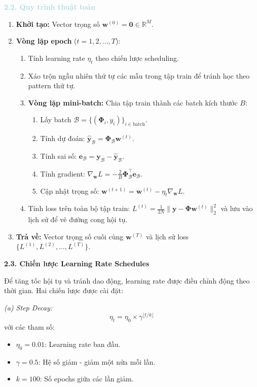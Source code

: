 \noindent\textcolor{lightblue}{\textbf{2.2. Quy trình thuật toán}}
\begin{enumerate}
    \item \textbf{Khởi tạo:} Vector trọng số $\mathbf{w}^{(0)} = \mathbf{0} \in \mathbb{R}^{M}$.
    
    \item \textbf{Vòng lặp epoch} ($t = 1, 2, \ldots, T$):
    \begin{enumerate}
        \item Tính learning rate $\eta_t$ theo chiến lược scheduling.
        \item Xáo trộn ngẫu nhiên thứ tự các mẫu trong tập train để tránh học theo pattern thứ tự.
        \item \textbf{Vòng lặp mini-batch:} Chia tập train thành các batch kích thước $B$:
        \begin{enumerate}
            \item Lấy batch $\mathcal{B} = \{(\mathbf{\Phi}_i, y_i)\}_{i \in \text{batch}}$.
            \item Tính dự đoán: $\hat{\mathbf{y}}_{\mathcal{B}} = \mathbf{\Phi}_{\mathcal{B}} \mathbf{w}^{(t)}$.
            \item Tính sai số: $\mathbf{e}_{\mathcal{B}} = \mathbf{y}_{\mathcal{B}} - \hat{\mathbf{y}}_{\mathcal{B}}$.
            \item Tính gradient: $\nabla_{\mathbf{w}} L = -\frac{2}{B} \mathbf{\Phi}_{\mathcal{B}}^{\top} \mathbf{e}_{\mathcal{B}}$.
            \item Cập nhật trọng số: $\mathbf{w}^{(t+1)} = \mathbf{w}^{(t)} - \eta_t \nabla_{\mathbf{w}} L$.
        \end{enumerate}
        \item Tính loss trên toàn bộ tập train: $L^{(t)} = \frac{1}{2N}\|\mathbf{y} - \mathbf{\Phi}\mathbf{w}^{(t)}\|^2_2$ và lưu vào lịch sử để vẽ đường cong hội tụ.
    \end{enumerate}
    
    \item \textbf{Trả về:} Vector trọng số cuối cùng $\mathbf{w}^{(T)}$ và lịch sử loss $\{L^{(1)}, L^{(2)}, \ldots, L^{(T)}\}$.
\end{enumerate}

\textbf{2.3. Chiến lược Learning Rate Schedules}

Để tăng tốc hội tụ và tránh dao động, learning rate được điều chỉnh động theo thời gian. Hai chiến lược được cài đặt:

\textit{(a) Step Decay:}
\begin{equation}
\eta_t = \eta_0 \times \gamma^{\lfloor t / k \rfloor}
\end{equation}
với các tham số:
\begin{itemize}
    \item $\eta_0 = 0.01$: Learning rate ban đầu.
    \item $\gamma = 0.5$: Hệ số giảm - giảm một nửa mỗi lần.
    \item $k = 100$: Số epochs giữa các lần giảm.
\end{itemize}


